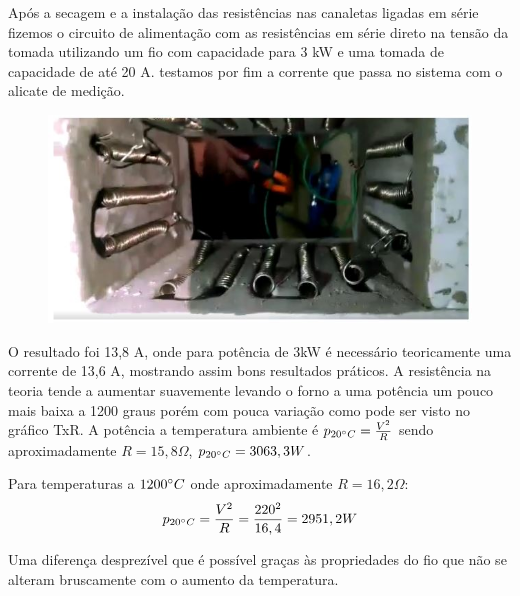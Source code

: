 Após a secagem e a instalação das resistências nas canaletas ligadas em série fizemos o circuito de alimentação com as resistências em série direto na tensão da tomada utilizando um fio com capacidade para 3 kW e uma tomada de capacidade de até 20 A. testamos por fim a corrente que passa no sistema com o alicate de medição.
\begin{figure}[ht]
	\centering
	\label{foto8}
	\includegraphics[keepaspectratio=true,scale=1.0]{figuras/alimentacao13.JPG}
\end{figure}

O resultado foi 13,8 A, onde para potência de 3kW é necessário teoricamente uma corrente de 13,6 A, mostrando assim bons resultados práticos. A resistência na teoria tende a aumentar suavemente levando o forno a uma potência um pouco mais baixa a 1200 graus porém com pouca variação como pode ser visto no gráfico TxR. A potência a temperatura ambiente é $p_{20 \degree C} = \frac{V^{2}}{R}$ sendo aproximadamente $R = 15,8 \Omega$, $p_{20 \degree C} = 3063,3W$.

Para temperaturas a $1200\degree C$ onde aproximadamente $R = 16,2\Omega$:
\begin{gather}
    p_{20 \degree C} = \frac{V^{2}}{R} = \frac{220^{2}}{16,4} = 2951,2W
\end{gather}

Uma diferença desprezível que é possível graças às propriedades do fio que não se alteram bruscamente com o aumento da temperatura.

